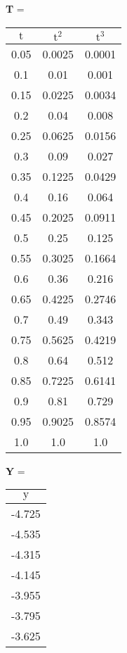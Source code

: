 \renewcommand{\arraystretch}{0.65}
\begin{center}
    \textrm{\textbf{T}} = \begin{tabular}{ | c | c | c | } 
    \hline
    $\textrm{t}$ & $\textrm{t}^2$ & $\textrm{t}^3$ \\
    \hline
    0.05 & 0.0025 & 0.0001 \\ 
    \hline 
   0.1 & 0.01 & 0.001 \\ 
    \hline 
   0.15 & 0.0225 & 0.0034 \\ 
    \hline 
   0.2 & 0.04 & 0.008 \\ 
    \hline 
   0.25 & 0.0625 & 0.0156 \\ 
    \hline 
   0.3 & 0.09 & 0.027 \\ 
    \hline 
   0.35 & 0.1225 & 0.0429 \\ 
    \hline 
   0.4 & 0.16 & 0.064 \\ 
    \hline 
   0.45 & 0.2025 & 0.0911 \\ 
    \hline 
   0.5 & 0.25 & 0.125 \\ 
    \hline 
   0.55 & 0.3025 & 0.1664 \\ 
    \hline 
   0.6 & 0.36 & 0.216 \\ 
    \hline 
   0.65 & 0.4225 & 0.2746 \\ 
    \hline 
   0.7 & 0.49 & 0.343 \\ 
    \hline 
   0.75 & 0.5625 & 0.4219 \\ 
    \hline 
   0.8 & 0.64 & 0.512 \\ 
    \hline 
   0.85 & 0.7225 & 0.6141 \\ 
    \hline 
   0.9 & 0.81 & 0.729 \\ 
    \hline 
   0.95 & 0.9025 & 0.8574 \\ 
    \hline 
   1.0 & 1.0 & 1.0 \\ 
    \hline 
    \end{tabular}
    \quad
    \textrm{\textbf{Y}} = \begin{tabular}{ | c | } 
        \hline
        $\textrm{y}$ \\
        \hline
        -4.725 \\
        \hline
        -4.535 \\
        \hline
        -4.315 \\
        \hline
        -4.145 \\
        \hline
        -3.955 \\
        \hline
        -3.795 \\
        \hline
        -3.625 \\

\end{tabular}
\end{center}
